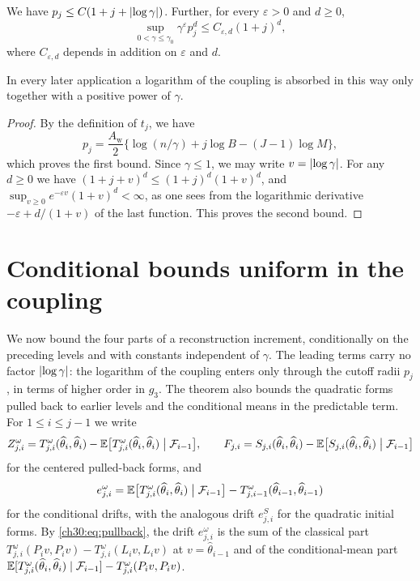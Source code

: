 \begin{lemma}\label{ch30:lem:cutoff-logarithms}
We have $p_j\le C(1+j+\lvert \log\gamma\rvert)$. Further, for every $\varepsilon>0$ and $d\ge0$,
\[
 \sup_{0<\gamma\le\gamma_0}\gamma^{\varepsilon}p_j^d\le C_{\varepsilon,d}(1+j)^d,
\]
where $C_{\varepsilon,d}$ depends in addition on $\varepsilon$ and $d$.
\end{lemma}

In every later application a logarithm of the coupling is absorbed in this way only together with a positive power of $\gamma$.

\begin{proof}
By the definition of $t_j$, we have
\[
 p_j=\frac{A_{\mathrm w}}{2}\bigl\{\log(n/\gamma)+j\log B-(J-1)\log M\bigr\},
\]
which proves the first bound. Since $\gamma\le1$, we may write $v=\lvert \log\gamma\rvert$. For any $d\ge0$ we have $(1+j+v)^d\le(1+j)^d(1+v)^d$, and $\sup_{v\ge0}e^{-\varepsilon v}(1+v)^d<\infty$, as one sees from the logarithmic derivative $-\varepsilon+d/(1+v)$ of the last function. This proves the second bound.
\end{proof}

\section{Conditional bounds uniform in the coupling}\label{ch30:sec:maxima}

We now bound the four parts of a reconstruction increment, conditionally on the preceding levels and with constants independent of $\gamma$. The leading terms carry no factor $\lvert \log\gamma\rvert$: the logarithm of the coupling enters only through the cutoff radii $p_j$, in terms of higher order in $g_3$. The theorem also bounds the quadratic forms pulled back to earlier levels and the conditional means in the predictable term. For $1\le i\le j-1$ we write
\[
 Z^\omega_{j,i}=T^\omega_{j,i}(\widehat\theta_i,\widehat\theta_i)-\mathbb E\bigl[T^\omega_{j,i}(\widehat\theta_i,\widehat\theta_i)\bigm|\mathcal F_{i-1}\bigr],\qquad
 F_{j,i}=S_{j,i}(\widehat\theta_i,\widehat\theta_i)-\mathbb E\bigl[S_{j,i}(\widehat\theta_i,\widehat\theta_i)\bigm|\mathcal F_{i-1}\bigr]
\]
for the centered pulled-back forms, and
\[
 e^\omega_{j,i}=\mathbb E\bigl[T^\omega_{j,i}(\widehat\theta_i,\widehat\theta_i)\bigm|\mathcal F_{i-1}\bigr]-T^\omega_{j,i-1}(\widehat\theta_{i-1},\widehat\theta_{i-1})
\]
for the conditional drifts, with the analogous drift $e^{S}_{j,i}$ for the quadratic initial forms. By \eqref{ch30:eq:pullback}, the drift $e^\omega_{j,i}$ is the sum of the classical part $T^\omega_{j,i}(P_iv,P_iv)-T^\omega_{j,i}(L_iv,L_iv)$ at $v=\widehat\theta_{i-1}$ and of the conditional-mean part $\mathbb E[T^\omega_{j,i}(\widehat\theta_i,\widehat\theta_i)\mid\mathcal F_{i-1}]-T^\omega_{j,i}(P_iv,P_iv)$.

